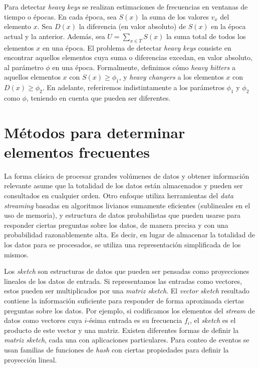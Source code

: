 \documentclass[a4paper,10pt, oneside]{article}
\begin{document}
Para detectar \textit{heavy keys} se realizan estimaciones de frecuencias en ventanas de tiempo o épocas. En cada época, sea $S(x)$ la suma de los valores $v_x$ del elemento $x$. Sea $D(x)$ la diferencia (en valor absoluto) de $S(x)$ en la época actual y la anterior. Además, sea $U=\sum_{x \in T} S(x)$ la suma total de todos los elementos $x$ en una época. El problema de detectar \textit{heavy keys} consiste en encontrar aquellos elementos cuya suma o diferencias excedan, en valor absoluto, al parámetro $\phi$ en una época. Formalmente, definimos cómo \textit{heavy hitters} a aquellos elementos $x$ con $S(x) \geq \phi_1$, y \textit{heavy changers} a los elementos $x$ con $D(x) \geq \phi_2$. En adelante, referiremos indistintamente a los parámetros $\phi_1$ y $\phi_2$ como $\phi$, teniendo en cuenta que pueden ser diferentes.

\section{Métodos para determinar elementos frecuentes}

La forma clásica de procesar grandes volúmenes de datos y obtener información relevante asume que la totalidad de los datos están almacenados y pueden ser consultados en cualquier orden. Otro enfoque utiliza herramientas del \textit{data streaming} basadas en algoritmos livianos sumamente eficientes (sublineales en el uso de memoria), y estructura de datos probabilistas que pueden usarse para responder ciertas preguntas sobre los datos, de manera precisa y con una probabilidad razonablemente alta. Es decir, en lugar de almacenar la totalidad de los datos para se procesados, se utiliza una representación simplificada de los mismos.

Los \textit{sketch} son estructuras de datos que pueden ser pensadas como proyecciones lineales de los datos de entrada. Si representamos las entradas como vectores, estos pueden ser multiplicados por una \textit{matriz sketch}. El \textit{vector sketch} resultado contiene la  información suficiente para responder de forma aproximada ciertas preguntas sobre los datos. Por ejemplo, si codificamos los elementos del \textit{stream} de datos como vectores cuya $i$-ésima entrada es su frecuencia $f_i$, el \textit{sketch} es el producto de este vector y una matriz. Existen diferentes formas de definir la \textit{matriz sketch}, cada una con aplicaciones particulares. Para conteo de eventos se usan familias de funciones de \textit{hash} con ciertas propiedades para definir la proyección lineal.
\end{document}
